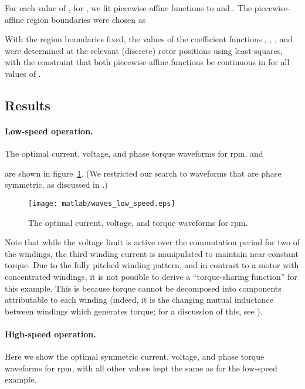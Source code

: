 \documentclass[11pt]{article}
\newif\ifarxiv
\begin{document}
For each value of , for ,
we fit piecewise-affine functions to  and .
The piecewise-affine region boundaries were chosen as

With the region boundaries fixed,
the values of the coefficient functions , , , and 
were determined at the relevant (discrete) rotor positions using least-squares,
with the constraint that both piecewise-affine functions be continuous
in  for all values of .




\subsection{Results}

\paragraph{Low-speed operation.}
The optimal current, voltage, and phase torque waveforms
for  rpm,   and
 
are shown in figure~\ref{f-waves-low-speed}.
(We restricted our search to waveforms that are phase symmetric,
as discussed in .)

\begin{figure} 
\begin{center}
\ifarxiv
\texttt{[image: waves\_low\_speed.eps]}
\else
\texttt{[image: matlab/waves\_low\_speed.eps]}
\fi
\caption{
The optimal current, voltage, and torque waveforms for
 rpm.
}
\label{f-waves-low-speed}
\end{center}
\end{figure}

Note that while the voltage limit is active over the commutation period
for two of the windings,
the third winding current is manipulated to maintain near-constant torque.
Due to the fully pitched winding pattern,
and in contrast to a motor with concentrated windings, 
it is not possible to derive a ``torque-sharing function'' for this example.
This is because torque cannot be decomposed into components attributable to each winding
(indeed, it is the changing mutual inductance between windings which generates torque;
for a discussion of this, see \cite{mecrow1993fully}).

\paragraph{High-speed operation.}
Here we show the optimal symmetric
current, voltage, and phase torque waveforms
for  rpm,
with all other values kept the same as for the low-speed example.
\end{document}
